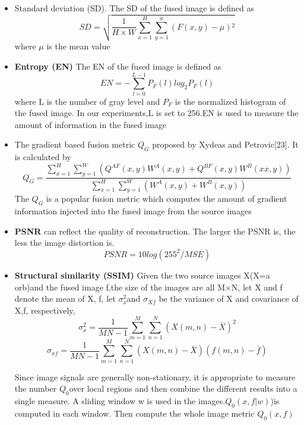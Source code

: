 \begin{itemize}
\item Standard deviation (SD). The SD of the fused image is defined as 
 \begin{equation}
 SD=\sqrt{\frac{1}{ H \times W}\sum_{x=1}^{H}\sum_{y=1}^{w} {\left(F\left(x,y \right) -\mu \right)}{^2}}
 \end{equation}
 where \(\mu\) is the mean value
\item  \textbf{Entropy (EN)} The EN of the fused image is defined as
\begin{equation}
EN=-\sum _{l=0}^{L-1}P_{F}\left(l \right)log_{2}{P}_{F}\left(l \right)
\end{equation}
where L is the number of gray level and \(P_{F} \)
is the normalized histogram of the fused image. In our experiments,L is set to 256.EN is used to measure the amount of information in the fused image
\item  The gradient based fusion metric \(Q_{G}\) proposed by Xydeas and Petrovic[23]. It is calculated by
\begin{equation}
Q_{G}=\frac{\sum _{x=1}^{H}\sum _{y=1}^{W}\left(Q^{AF}\left(x,y \right)W^{A} \left(x,y \right)+Q^{BF}\left(x,y \right)W^{B}\left(xx,y \right)\right)}{\sum _{x=1}^{H}\sum_{y=1}^{W}\left(W^{A}\left(x,y \right)+W^{B}\left(x,y \right) \right) }
\end{equation}
 The \(Q_{G}\) is a popular
fusion metric which computes the amount of gradient information injected into the fused image from the source images
\item \textbf{PSNR } can reflect the quality of reconstruction. The larger the PSNR
is, the less the image distortion is.
\begin{equation}
PSNR=10 log\left(255^{2}/MSE\right)
\end{equation}

\item  \textbf{Structural similarity (SSIM)} Given the two source images X(X=a  orb)and the fused image f,the size of the images are all M×N, let X and f denote the mean of X, f, let \(\sigma_{x}^{2}\)and \(\sigma_{Xf}\) be the variance of X and covariance of X,f, respectively,
\begin{equation}
\sigma _{x}^{2}=\frac{1}{MN-1}\sum_{m=1}^{M} \sum_{n=1}^{N}{\left(X\left(m,n \right)-\bar{X} \right)}^{2} 
\end{equation}
\begin{equation}
\sigma _{xf}=\frac{1}{MN-1}\sum_{m=1}^{M} \sum_{n=1}^{N}\left(X\left(m,n \right)-\bar{X} \right) \left(f\left(m,n \right) -\bar{f}\right)
\end{equation}

Since image signals are generally non-stationary, it is appropriate to measure the number \(Q_{0}\)over local regions and then combine the different results into a single measure. A sliding window w is used in the images.\(Q_{0}(x,f|w)\))is computed in each window. Then compute the whole image metric \(Q_{0}(x,f)\)

\end{itemize}




